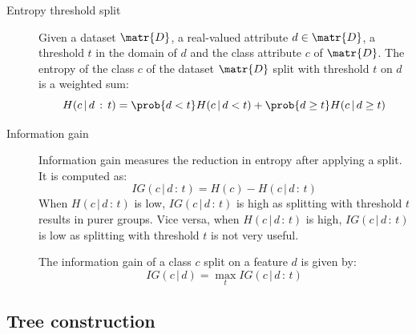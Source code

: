 \begin{description}
    \item[Entropy threshold split] 
        Given a dataset $\matr{D}$, 
        a real-valued attribute $d \in \matr{D}$,
        a threshold $t$ in the domain of $d$ and
        the class attribute $c$ of $\matr{D}$.
        The entropy of the class $c$ of the dataset $\matr{D}$ split with threshold $t$ on $d$ is a weighted sum:
        \[ H(c \,\vert\, d \,:\, t) = \prob{d < t}H(c \,\vert\, d < t) + \prob{d \geq t}H(c \,\vert\, d \geq t) \]

    \item[Information gain] 
        Information gain measures the reduction in entropy after applying a split.
        It is computed as:
        \[ IG(c \,\vert\, d \,:\, t) = H(c) - H(c \,\vert\, d \,:\, t) \]
        When $H(c \,\vert\, d \,:\, t)$ is low, $IG(c \,\vert\, d \,:\, t)$ is high 
        as splitting with threshold $t$ results in purer groups.
        Vice versa, when $H(c \,\vert\, d \,:\, t)$ is high, $IG(c \,\vert\, d \,:\, t)$ is low
        as splitting with threshold $t$ is not very useful.

        The information gain of a class $c$ split on a feature $d$ is given by:
        \[ IG(c \,\vert\, d) = \max_t IG(c \,\vert\, d \,:\, t) \]
\end{description}


\subsection{Tree construction}

